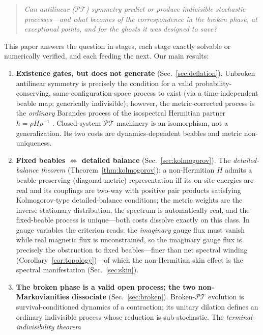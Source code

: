 \documentclass[11pt]{article}
\theoremstyle{definition}
\theoremstyle{remark}
\newcommand{\PT}{\mathcal{PT}}
\begin{document}
\begin{quote}
\emph{Can antilinear ($\PT$) symmetry predict or produce indivisible
stochastic processes---and what becomes of the correspondence in the broken
phase, at exceptional points, and for the ghosts it was designed to save?}
\end{quote}

This paper answers the question in stages, each stage exactly solvable or
numerically verified, and each feeding the next. Our main results:

\begin{enumerate}
\item \textbf{Existence gates, but does not generate}
  (Sec.~\ref{sec:deflation}). Unbroken antilinear symmetry is precisely the
  condition for a valid probability-conserving, same-configuration-space
  process to exist (via a time-independent beable map; generically indivisible); however, the
  metric-corrected process is the \emph{ordinary} Barandes process of the
  isospectral Hermitian partner $h=\rho H\rho^{-1}$
  \cite{Mostafazadeh2002}. Closed-system $\PT$ machinery is an isomorphism,
  not a generalization. Its two costs are dynamics-dependent beables and
  metric non-uniqueness.
\item \textbf{Fixed beables $\Leftrightarrow$ detailed balance}
  (Sec.~\ref{sec:kolmogorov}). The \emph{detailed-balance theorem}
  (Theorem~\ref{thm:kolmogorov}): a
  non-Hermitian $H$ admits a beable-preserving (diagonal-metric)
  representation iff its on-site energies are real and its couplings
  are two-way with positive pair products satisfying Kolmogorov-type detailed-balance
  conditions; the metric weights are the inverse stationary distribution,
  the spectrum is automatically real, and the fixed-beable process is
  unique---both costs dissolve exactly on this class. In gauge variables
  the criterion reads: the \emph{imaginary} gauge flux must vanish while
  real magnetic flux is unconstrained, so the imaginary gauge flux is
  precisely the obstruction to fixed beables---finer than net spectral
  winding (Corollary~\ref{cor:topology})---of which the non-Hermitian skin
  effect \cite{HatanoNelson1996,Okuma2020} is the spectral manifestation
  (Sec.~\ref{sec:skin}).
\item \textbf{The broken phase is a valid open process; the two
  non-Markovianities dissociate} (Sec.~\ref{sec:broken}). Broken-$\PT$
  evolution is survival-conditioned dynamics of a contraction; its unitary
  dilation defines an ordinary indivisible process whose reduction is
  sub-stochastic. The \emph{terminal-indivisibility theorem}

\end{enumerate}
\end{document}

